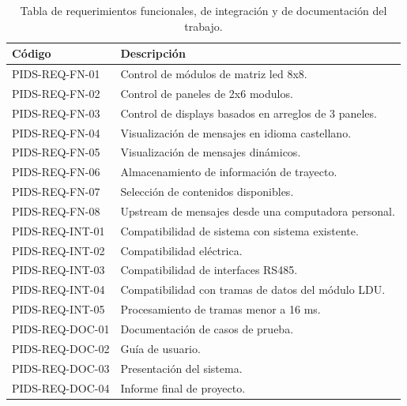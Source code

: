 \begin{table}[htb]
\caption{Tabla de requerimientos funcionales, de integración y de documentación del trabajo.}
\label{tab:Reqs}
\begin{center}
\begin{tabular}{ll}
\toprule
\textbf{Código} & \textbf{Descripción}                                 \\ \midrule
PIDS-REQ-FN-01  & Control de módulos de matriz led 8x8.                 \\ \hline
PIDS-REQ-FN-02  & Control de paneles de 2x6 modulos.                    \\ \hline
PIDS-REQ-FN-03  & Control de displays basados en arreglos de 3 paneles. \\ \hline
PIDS-REQ-FN-04  & Visualización de mensajes en idioma castellano.       \\ \hline
PIDS-REQ-FN-05  & Visualización de mensajes dinámicos.                  \\ \hline
PIDS-REQ-FN-06  & Almacenamiento de información de trayecto.            \\ \hline
PIDS-REQ-FN-07  & Selección de contenidos disponibles.                  \\ \hline
PIDS-REQ-FN-08  & Upstream de mensajes desde una computadora personal.  \\ \hline
PIDS-REQ-INT-01 & Compatibilidad de sistema con sistema existente.      \\ \hline
PIDS-REQ-INT-02 & Compatibilidad eléctrica.                             \\ \hline
PIDS-REQ-INT-03 & Compatibilidad de interfaces RS485.                   \\ \hline
PIDS-REQ-INT-04 & Compatibilidad con tramas de datos del módulo LDU.    \\ \hline
PIDS-REQ-INT-05 & Procesamiento de tramas menor a 16 ms.                \\ \hline
PIDS-REQ-DOC-01 & Documentación de casos de prueba.                     \\ \hline
PIDS-REQ-DOC-02 & Guía de usuario.                                      \\ \hline
PIDS-REQ-DOC-03 & Presentación del sistema.                             \\ \hline
PIDS-REQ-DOC-04 & Informe final de proyecto.                            \\ \bottomrule
\end{tabular}
\end{center}
\end{table}


